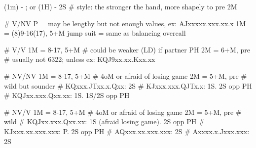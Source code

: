(1m) - ; or (1H) - 2S
# style: the stronger the hand, more shapely to pre 2M

# V/NV
P  = may be lengthy but not enough values, ex: AJxxxxx.xxx.xx.x
1M = (8)9-16(17), 5+M
jump suit = same as balancing overcall

# V/V
1M = 8-17, 5+M  # could be weaker (LD) if partner PH
2M = 6+M, pre  # usually not 6322; unless ex: KQJ9xx.xx.Kxx.xx

# NV/NV
1M = 8-17, 5+M  # 4oM or afraid of losing game
2M = 5+M, pre  # wild but sounder
# KQxxx.JTxx.x.Qxx: 2S
# KJxxx.xxx.QJTx.x: 1S. 2S opp PH
# KQJxx.xxx.Qxx.xx: 1S. 1S/2S opp PH

# NV/V
1M = 8-17, 5+M  # 4oM or afraid of losing game
2M = 5+M, pre  # wild
# KQJxx.xxx.Qxx.xx: 1S (afraid losing game). 2S opp PH
# KJxxx.xx.xxx.xxx: P. 2S opp PH
# AQxxx.xx.xxx.xxx: 2S
# Axxxx.x.Jxxx.xxx: 2S